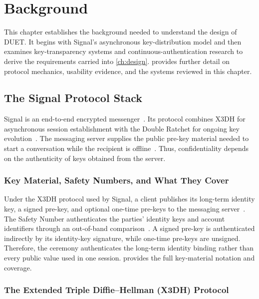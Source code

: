 \chapter{Background}\label{ch:background}

This chapter establishes the background needed to understand the design of DUET. It begins with
Signal's asynchronous key-distribution model and then examines key-transparency systems and
continuous-authentication research to derive the requirements carried into \cref{ch:design}.
 provides further detail on protocol mechanics, usability evidence, and
the systems reviewed in this chapter.

\section{The Signal Protocol Stack}\label{sec:bg-signal}

Signal is an end-to-end encrypted messenger~\cite{signal-home}. Its
protocol combines X3DH for asynchronous session establishment with the Double Ratchet for ongoing key
evolution~\cite{x3dh,doubleratchet}. The messaging server supplies the public pre-key material needed to start a
conversation while the recipient is offline~\cite[Sections~3.1--3.3]{x3dh}. Thus, confidentiality depends on the
authenticity of keys obtained from the server.

\subsection{Key Material, Safety Numbers, and What They Cover}\label{ssec:bg-keymat}

Under the X3DH protocol used by Signal, a client publishes its long-term identity key, a signed
pre-key, and optional one-time pre-keys to the messaging server~\cite[Sections~2.4 and 3.2]{x3dh}. The Safety
Number authenticates the parties' identity keys and account identifiers through an out-of-band
comparison~\cite{safetynumbers}. A signed pre-key is authenticated indirectly by its identity-key
signature, while one-time pre-keys are unsigned. Therefore, the ceremony authenticates the long-term
identity binding rather than every public value used in one session.  provides the
full key-material notation and coverage.

\subsection{The Extended Triple Diffie--Hellman (X3DH) Protocol}\label{ssec:bg-x3dh}

